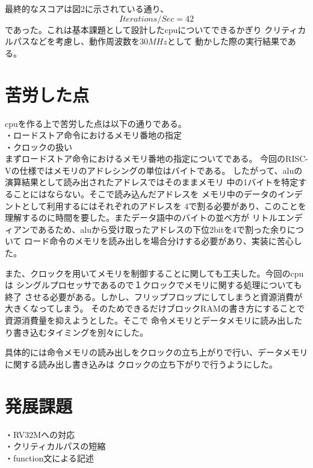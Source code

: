 \documentclass[12pt]{jreport}
\begin{document}
  最終的なスコアは図2に示されている通り、
  \begin{equation}Iterations/Sec=42\end{equation}
  であった。これは基本課題として設計したcpuについてできるかぎり
  クリティカルパスなどを考慮し、動作周波数を$30MHz$として
  動かした際の実行結果である。

  \section{苦労した点}
  cpuを作る上で苦労した点は以下の通りである。\\
  ・ロードストア命令におけるメモリ番地の指定\\
  ・クロックの扱い\\ 
  
  まずロードストア命令におけるメモリ番地の指定についてである。
  今回のRISC-Vの仕様ではメモリのアドレシングの単位はバイトである。
  したがって、aluの演算結果として読み出されたアドレスではそのままメモリ
  中の1バイトを特定することにはならない。そこで読み込んだアドレスを
  メモリ中のデータのインデントとして利用するにはそれぞれのアドレスを
  4で割る必要があり、このことを理解するのに時間を要した。またデータ語中のバイトの並べ方が
  リトルエンディアンであるため、aluから受け取ったアドレスの下位2bitを4で割った余りについて
  ロード命令のメモリを読み出しを場合分けする必要があり、実装に苦心した。

  また、クロックを用いてメモリを制御することに関しても工夫した。今回のcpuは
  シングルプロセッサであるので１クロックでメモリに関する処理についても終了
  させる必要がある。しかし、フリップフロップにしてしまうと資源消費が大きくなってしまう。
  そのためできるだけブロックRAMの書き方にすることで資源消費量を抑えようとした。そこで
  命令メモリとデータメモリに読み出したり書き込むタイミングを別々にした。


  具体的には命令メモリの読み出しをクロックの立ち上がりで行い、データメモリに関する読み出し書き込みは
  クロックの立ち下がりで行うようにした。

  \section{発展課題}
  ・RV32Mへの対応\\
  ・クリティカルパスの短縮\\
  ・function文による記述\\
\end{document}
